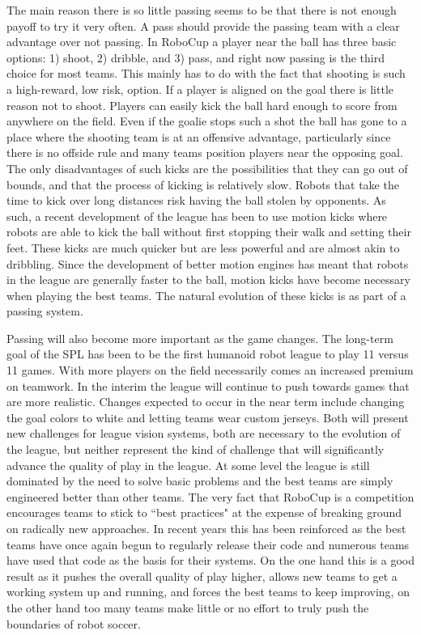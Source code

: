 \documentclass{llncs}
\begin{document}
The main reason there is so little passing seems to be that there is not enough payoff
to try it very often. A pass should provide the passing team with a clear advantage over
not passing. In RoboCup a player near the ball has three basic options: 1) shoot, 2) dribble,
and 3) pass, and right now passing is the third choice for most teams. This mainly has
to do with the fact that shooting is such a high-reward, low risk, option.
If a player is aligned on the goal there is little reason not to shoot. Players
can easily kick the ball hard enough to score from anywhere on the field. Even if the
goalie stops such a shot the ball has gone to a place where the shooting team is at an
offensive advantage, particularly since there is no offside rule and many teams
position players near the opposing goal. The only disadvantages of such kicks are
the possibilities that they can go out of bounds, and that the process of kicking is
relatively slow. Robots that take the time to kick over long distances risk having the
ball stolen by opponents. As such, a recent development of the league has been to
use motion kicks where robots are able to kick the ball without first stopping their
walk and setting their feet. These kicks are much quicker but are less powerful and
are almost akin to dribbling. Since the development of better motion engines has meant
that robots in the league are generally faster to the ball, motion kicks have become
necessary when playing the best teams. The natural evolution of these kicks is as
part of a passing system.

Passing will also become more important as the game changes. The long-term goal
of the SPL has been to be the first humanoid robot league to play 11 versus 11 games.
With more players on the field necessarily comes an increased premium on teamwork.
In the interim the league will continue to push towards games that are more realistic.
Changes expected to occur in the near term include changing the goal colors to white
and letting teams wear custom jerseys. Both will present new challenges for league vision
systems, both are necessary to the evolution of the league, but neither represent the
kind of challenge that will significantly advance the quality of play in the league. At some level
the league is still dominated by the need to solve basic problems and the best teams
are simply engineered better than other teams. The very fact that RoboCup is a competition
encourages teams to stick to ``best practices" at the expense of breaking ground on
radically new approaches. In recent years this has been reinforced as the best teams
have once again begun to regularly release their code and numerous teams have
used that code as the basis for their systems. On the one hand this is a good result
as it pushes the overall quality of play higher, allows new teams to get a working
system up and running, and forces the best teams to keep improving, on the other
hand too many teams make little or no effort to truly push the boundaries of robot
soccer. 
\end{document}
